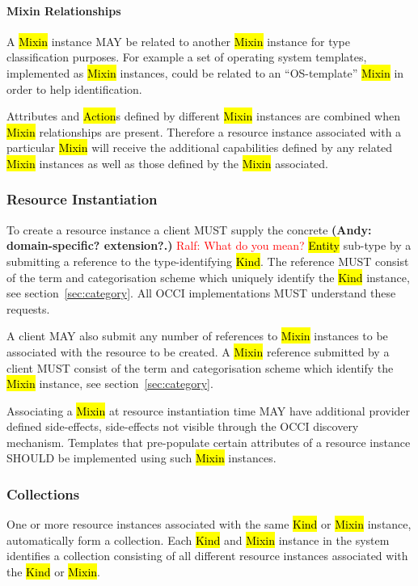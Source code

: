 \documentclass[10pt,a4paper]{article}
\newcommand{\ralf}[1]{\textcolor{red}{Ralf: #1}}
\begin{document}
\paragraph*{Mixin Relationships}

A \hl{Mixin} instance MAY be related to another \hl{Mixin} instance for
type classification purposes. For example a set of operating system templates,
implemented as \hl{Mixin} instances, could be related to an ``OS-template''
\hl{Mixin} in order to help identification.

Attributes and \hl{Action}s defined by different \hl{Mixin} instances are
combined when \hl{Mixin} relationships are present. Therefore a resource
instance associated with a particular \hl{Mixin} will receive the additional
capabilities defined by any related \hl{Mixin} instances as well as those
defined by the \hl{Mixin} associated.

\subsubsection{Resource Instantiation}
\label{sec:instantiation}
To create a resource instance a client MUST supply the concrete
\textbf{(Andy: domain-specific? extension?.)} 
\ralf{What do you mean?}
\hl{Entity} sub-type by a submitting a reference to the type-identifying \hl{Kind}.
The reference MUST consist of the term and categorisation scheme which
uniquely identify the \hl{Kind} instance, see section~\ref{sec:category}.
All OCCI implementations MUST understand these requests.

A client MAY also submit any number of references to \hl{Mixin} instances to be
associated with the resource to be created. A \hl{Mixin} reference submitted by
a client MUST consist of the term and categorisation scheme which identify
the \hl{Mixin} instance, see section~\ref{sec:category}. 

Associating a \hl{Mixin} at resource
instantiation time MAY have additional provider defined side-effects,
side-effects not visible through the OCCI discovery mechanism. Templates that
pre-populate certain attributes of a resource instance SHOULD be implemented
using such \hl{Mixin} instances.

\subsubsection{Collections}
\label{sec:collection}
One or more resource instances associated with the same \hl{Kind} or \hl{Mixin}
instance, automatically form a collection.
Each \hl{Kind} and \hl{Mixin} instance in the system identifies a collection
consisting of all different resource instances associated with the \hl{Kind} or
\hl{Mixin}.
\end{document}
